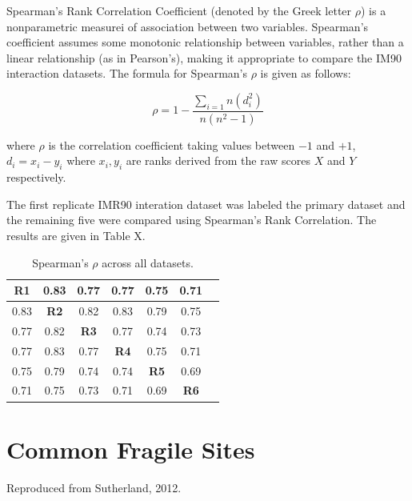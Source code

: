 \documentclass[phd,tocprelim]{cornell}
\begin{document}
Spearman's Rank Correlation Coefficient (denoted by the Greek letter $\rho$) is
a nonparametric measurei of association between two variables.
Spearman's coefficient assumes some monotonic relationship between variables,
rather than a linear relationship (as in Pearson's), making it appropriate
to compare the IM90 interaction datasets.  The formula for Spearman's $\rho$ is
given as follows:

\begin{equation}
\rho = 1 - \frac{\sum_{i=1}{n}(d_i^2)}{n(n^2 - 1)}
\end{equation}

where $\rho$ is the correlation coefficient taking values between $-1$ and $+1$,
$d_i = x_i - y_i$ where $x_i, y_i$ are ranks derived from the raw scores $X$ and
$Y$ respectively.

The first replicate IMR90 interation dataset was labeled the primary dataset
and the remaining five were compared using Spearman's Rank Correlation.  The
results are given in Table X.

\begin{table}
  \begin{tabular}{|c|*{6}{c|}}
    \toprule
    \textbf{R1} & 0.83 & 0.77 & 0.77 & 0.75 & 0.71 \\ \midrule
    0.83 & \textbf{R2} & 0.82 & 0.83 & 0.79 & 0.75 \\ \midrule
    0.77 & 0.82 & \textbf{R3} & 0.77 & 0.74 & 0.73 \\ \midrule
    0.77 & 0.83 & 0.77 & \textbf{R4} & 0.75 & 0.71 \\ \midrule
    0.75 & 0.79 & 0.74 & 0.74 & \textbf{R5} & 0.69 \\ \midrule
    0.71 & 0.75 & 0.73 & 0.71 & 0.69 & \textbf{R6} \\ \midrule
  \end{tabular}
  \caption{Spearman's $\rho$ across all datasets.}
\label{tab:correlations}
\end{table}

\chapter{Common Fragile Sites}
Reproduced from Sutherland, 2012\cite{sutherland2001}.

\end{document}
